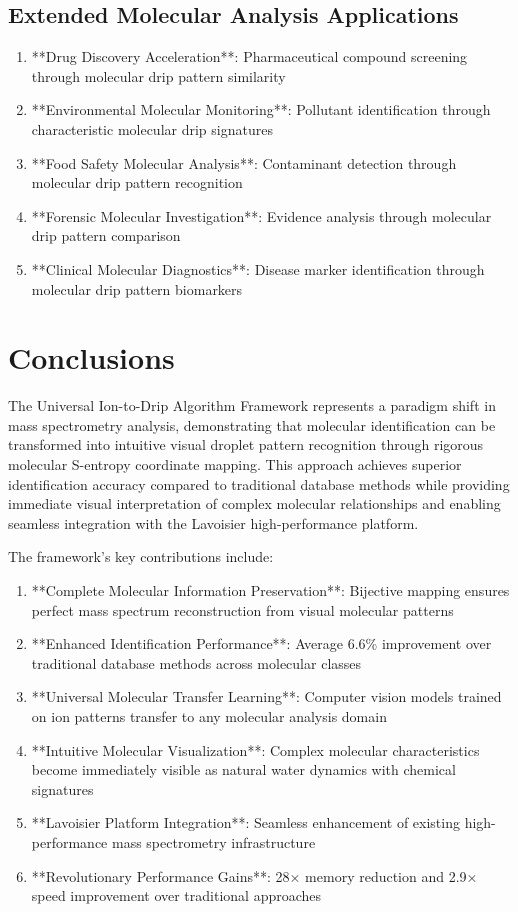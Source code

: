 \documentclass[12pt,a4paper]{article}
\begin{document}
\subsection{Extended Molecular Analysis Applications}

\begin{enumerate}
\item **Drug Discovery Acceleration**: Pharmaceutical compound screening through molecular drip pattern similarity
\item **Environmental Molecular Monitoring**: Pollutant identification through characteristic molecular drip signatures
\item **Food Safety Molecular Analysis**: Contaminant detection through molecular drip pattern recognition
\item **Forensic Molecular Investigation**: Evidence analysis through molecular drip pattern comparison
\item **Clinical Molecular Diagnostics**: Disease marker identification through molecular drip pattern biomarkers
\end{enumerate}

\section{Conclusions}

The Universal Ion-to-Drip Algorithm Framework represents a paradigm shift in mass spectrometry analysis, demonstrating that molecular identification can be transformed into intuitive visual droplet pattern recognition through rigorous molecular S-entropy coordinate mapping. This approach achieves superior identification accuracy compared to traditional database methods while providing immediate visual interpretation of complex molecular relationships and enabling seamless integration with the Lavoisier high-performance platform.

The framework's key contributions include:

\begin{enumerate}
\item **Complete Molecular Information Preservation**: Bijective mapping ensures perfect mass spectrum reconstruction from visual molecular patterns
\item **Enhanced Identification Performance**: Average 6.6\% improvement over traditional database methods across molecular classes
\item **Universal Molecular Transfer Learning**: Computer vision models trained on ion patterns transfer to any molecular analysis domain
\item **Intuitive Molecular Visualization**: Complex molecular characteristics become immediately visible as natural water dynamics with chemical signatures
\item **Lavoisier Platform Integration**: Seamless enhancement of existing high-performance mass spectrometry infrastructure
\item **Revolutionary Performance Gains**: 28× memory reduction and 2.9× speed improvement over traditional approaches
\end{enumerate}
\end{document}
